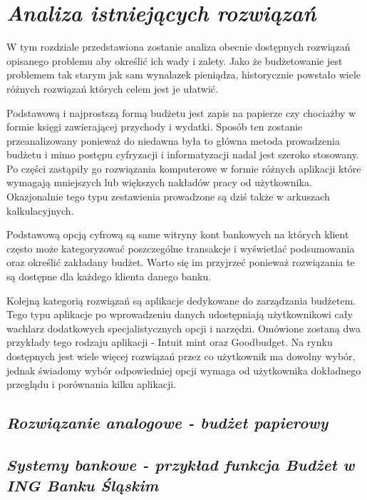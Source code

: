 \documentclass[a4paper,10pt, twoside]{report}
\newcommand{\customstylechapter}[1]{\large{\textit{#1}}}
\newcommand{\customstylesection}[1]{\textbf{\textit{#1}}}
\begin{document}
\chapter{\customstylechapter{Analiza istniejących rozwiązań}}
{W tym rozdziale przedstawiona zostanie analiza obecnie dostępnych rozwiązań 
opisanego problemu aby określić ich wady i zalety. Jako że budżetowanie jest 
problemem tak starym jak sam wynalazek pieniądza, historycznie powstało wiele 
różnych rozwiązań których celem jest je ułatwić.}

{Podstawową i najprostszą formą budżetu jest zapis na papierze czy chociażby w 
formie księgi zawierającej przychody i wydatki. Sposób ten zostanie 
przeanalizowany ponieważ do niedawna była to główna metoda prowadzenia budżetu 
i mimo postępu cyfryzacji i informatyzacji nadal jest szeroko stosowany. Po 
części zastąpiły go rozwiązania komputerowe w formie różnych aplikacji które 
wymagają mniejszych lub większych nakładów pracy od użytkownika. Okazjonalnie 
tego typu zestawienia prowadzone są dziś także w arkuszach kalkulacyjnych.}

{Podstawową opcją cyfrową są same witryny kont bankowych na których klient 
często może kategoryzować poszczególne transakcje i wyświetlać podsumowania oraz
 określić zakładany budżet. Warto się im przyjrzeć ponieważ rozwiązania te są 
dostępne dla każdego klienta danego banku.}

{Kolejną kategorią rozwiązań są aplikacje dedykowane do zarządzania budżetem. 
Tego typu aplikacje po wprowadzeniu danych udostępniają użytkownikowi cały 
wachlarz dodatkowych specjalistycznych opcji i narzędzi. Omówione zostaną dwa 
przykłady tego rodzaju aplikacji - Intuit mint\cite{mint} oraz 
Goodbudget\cite{goodbudget}. Na rynku dostępnych jest wiele więcej rozwiązań 
przez co użytkownik ma dowolny wybór, jednak świadomy wybór odpowiedniej opcji 
wymaga od użytkownika dokładnego przeglądu i porównania kilku aplikacji.}

\section{\customstylesection{Rozwiązanie analogowe - budżet papierowy}}
\section{\customstylesection{Systemy bankowe - przykład funkcja Budżet w ING Banku Śląskim}}
\end{document}
